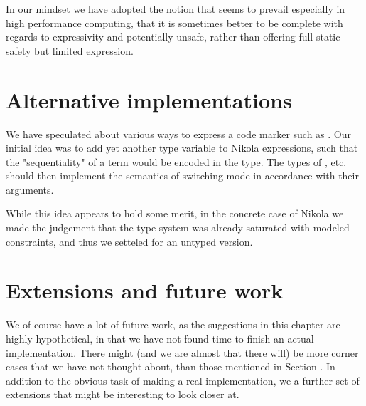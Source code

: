 In our mindset we have adopted the notion that seems to prevail especially in
high performance computing, that it is sometimes better to be complete with
regards to expressivity and potentially unsafe, rather than offering full
static safety but limited expression.


\section{Alternative implementations}

We have speculated about various ways to express a code marker such as
. Our initial idea was to add yet another type variable
to Nikola expressions, such that the "sequentiality" of a term would be encoded
in the type. The types of , etc. should
then implement the semantics of switching mode in accordance with their
arguments.

While this idea appears to hold some merit, in the concrete case of Nikola we
made the judgement that the type system was already saturated with modeled
constraints, and thus we setteled for an untyped version.

\section{Extensions and future work}
\label{sec:parallelism-future-work}

We of course have a lot of future work, as the suggestions in this
chapter are highly hypothetical, in that we have not found time to
finish an actual implementation. There might (and we are almost that
there will) be more corner cases that we have not thought about, than
those mentioned in Section . In addition to the obvious task
of making a real implementation, we a further set of extensions that
might be interesting to look closer at.

